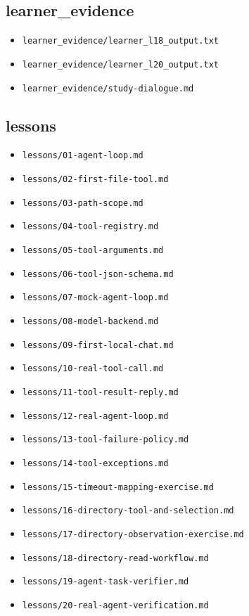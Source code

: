\subsection{learner\_evidence}
\begin{itemize}
\item \nolinkurl{learner_evidence/learner_l18_output.txt}
\item \nolinkurl{learner_evidence/learner_l20_output.txt}
\item \nolinkurl{learner_evidence/study-dialogue.md}
\end{itemize}

\subsection{lessons}
\begin{itemize}
\item \nolinkurl{lessons/01-agent-loop.md}
\item \nolinkurl{lessons/02-first-file-tool.md}
\item \nolinkurl{lessons/03-path-scope.md}
\item \nolinkurl{lessons/04-tool-registry.md}
\item \nolinkurl{lessons/05-tool-arguments.md}
\item \nolinkurl{lessons/06-tool-json-schema.md}
\item \nolinkurl{lessons/07-mock-agent-loop.md}
\item \nolinkurl{lessons/08-model-backend.md}
\item \nolinkurl{lessons/09-first-local-chat.md}
\item \nolinkurl{lessons/10-real-tool-call.md}
\item \nolinkurl{lessons/11-tool-result-reply.md}
\item \nolinkurl{lessons/12-real-agent-loop.md}
\item \nolinkurl{lessons/13-tool-failure-policy.md}
\item \nolinkurl{lessons/14-tool-exceptions.md}
\item \nolinkurl{lessons/15-timeout-mapping-exercise.md}
\item \nolinkurl{lessons/16-directory-tool-and-selection.md}
\item \nolinkurl{lessons/17-directory-observation-exercise.md}
\item \nolinkurl{lessons/18-directory-read-workflow.md}
\item \nolinkurl{lessons/19-agent-task-verifier.md}
\item \nolinkurl{lessons/20-real-agent-verification.md}

\end{itemize}

